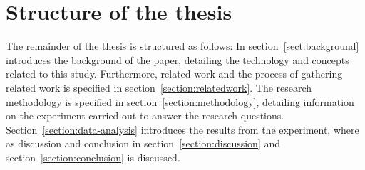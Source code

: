 \section{Structure of the thesis}
The remainder of the thesis is structured as follows: In section~\ref{sect:background} introduces the background of the paper, detailing the technology and concepts related to this study. Furthermore, related work and the process of gathering related work is specified in section~\ref{section:relatedwork}. The research methodology is specified in section~\ref{section:methodology}, detailing information on the experiment carried out to answer the research questions. Section~\ref{section:data-analysis} introduces the results from the experiment, where as discussion and conclusion in section~\ref{section:discussion} and section~\ref{section:conclusion} is discussed.  

